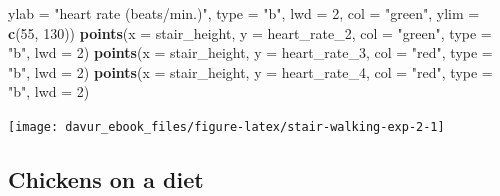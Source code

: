 \documentclass[]{book}
\newenvironment{Shaded}{\begin{snugshade}}{\end{snugshade}}
\newcommand{\DataTypeTok}[1]{\textcolor[rgb]{0.13,0.29,0.53}{#1}}
\newcommand{\DecValTok}[1]{\textcolor[rgb]{0.00,0.00,0.81}{#1}}
\newcommand{\KeywordTok}[1]{\textcolor[rgb]{0.13,0.29,0.53}{\textbf{#1}}}
\newcommand{\NormalTok}[1]{#1}
\newcommand{\StringTok}[1]{\textcolor[rgb]{0.31,0.60,0.02}{#1}}
\begin{document}
\begin{Shaded}
\begin{Highlighting}[]
    \DataTypeTok{ylab =} \StringTok{"heart rate (beats/min.)"}\NormalTok{,}
    \DataTypeTok{type =} \StringTok{"b"}\NormalTok{,}
    \DataTypeTok{lwd =} \DecValTok{2}\NormalTok{,}
    \DataTypeTok{col =} \StringTok{"green"}\NormalTok{,}
    \DataTypeTok{ylim =} \KeywordTok{c}\NormalTok{(}\DecValTok{55}\NormalTok{, }\DecValTok{130}\NormalTok{))}
\KeywordTok{points}\NormalTok{(}\DataTypeTok{x =}\NormalTok{ stair_height,}
    \DataTypeTok{y =}\NormalTok{ heart_rate_}\DecValTok{2}\NormalTok{,}
    \DataTypeTok{col =} \StringTok{"green"}\NormalTok{,}
    \DataTypeTok{type =} \StringTok{"b"}\NormalTok{,}
    \DataTypeTok{lwd =} \DecValTok{2}\NormalTok{)}
\KeywordTok{points}\NormalTok{(}\DataTypeTok{x =}\NormalTok{ stair_height,}
    \DataTypeTok{y =}\NormalTok{ heart_rate_}\DecValTok{3}\NormalTok{,}
    \DataTypeTok{col =} \StringTok{"red"}\NormalTok{,}
    \DataTypeTok{type =} \StringTok{"b"}\NormalTok{,}
    \DataTypeTok{lwd =} \DecValTok{2}\NormalTok{)}
\KeywordTok{points}\NormalTok{(}\DataTypeTok{x =}\NormalTok{ stair_height,}
    \DataTypeTok{y =}\NormalTok{ heart_rate_}\DecValTok{4}\NormalTok{,}
    \DataTypeTok{col =} \StringTok{"red"}\NormalTok{,}
    \DataTypeTok{type =} \StringTok{"b"}\NormalTok{,}
    \DataTypeTok{lwd =} \DecValTok{2}\NormalTok{)}
\end{Highlighting}
\end{Shaded}

\begin{center}\texttt{[image: davur\_ebook\_files/figure-latex/stair-walking-exp-2-1]} \end{center}

\hypertarget{chickens-on-a-diet-1}{%
\subsection{Chickens on a diet}\label{chickens-on-a-diet-1}}
\end{document}
